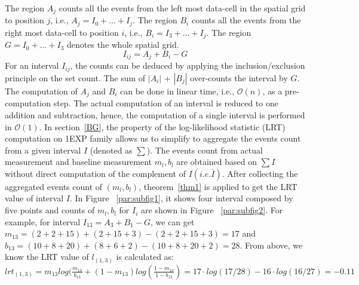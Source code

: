 \documentclass[AMA,LATO1COL]{WileyNJD-v2}
\newcommand\bigo{\mathcal O}
\begin{document}
The region $A_j$ counts all the events from the left most data-cell in
the spatial grid to position $j$, i.e., $A_j = I_0 + \ldots +
I_j$. The region $B_i$ counts all the events from the right most
data-cell to position $i$, i.e., $B_i =  I_3 + \ldots +
I_{j}$. The region $G = I_0 + \ldots + I_3$ denotes the whole spatial
grid.
\begin{equation}
I_{ij} = A_j + B_i - G
\end{equation}
For an interval $I_{ij}$, the counts can be deduced by applying the
inclusion/exclusion principle on the set count.  The sum of $|A_i|$ +
$|B_j|$ over-counts the interval by $G$. The computation of $A_j$ and
$B_i$ can be done in linear time, i.e., $\bigo(n)$, as a
pre-computation step. The actual computation of an interval is reduced
to one addition and subtraction, hence, the computation of a single
interval is performed in $\bigo(1)$. In section~\ref{BG}, the property of the log-likelihood statistic (LRT) computation on 1EXP family allows us to simplify to aggregate the events count from a given interval $I$ (denoted as $\sum $). The events count from actual measurement and baseline measurement $m_l,b_l$
are obtained based on $\sum I$ without direct computation of the complement of $I (i.e. \bar I)$. After collecting the aggregated events count of $(m_l,b_l)$, theorem~\ref{thm1} is applied to get the LRT value of interval $I$. In Figure ~\ref{par:subfig1}, it shows four interval composed by five points and counts of $m_l,b_l$ for $I_i$ are shown in Figure ~\ref{par:subfig2}. For example, for interval $I_{13}=A_3+B_1-G$, we can get $m_{13}=(2+2+15)+(2+15+3)-(2+2+15+3)=17$ and $b_{13}=(10+8+20)+(8+6+2)-(10+8+20+2)=28$. From above, we know the LRT value of $l_{(1,3)}$ is calculated as: $lrt_{(1,3)}=m_{13}log(\frac{m_{13}}{b_{13}}+(1-m_{13})log(\frac{1-m_{13}}{1-b_{13}})=17\cdot log(17/28)-16\cdot log(16/27)=-0.11$



\end{document}
